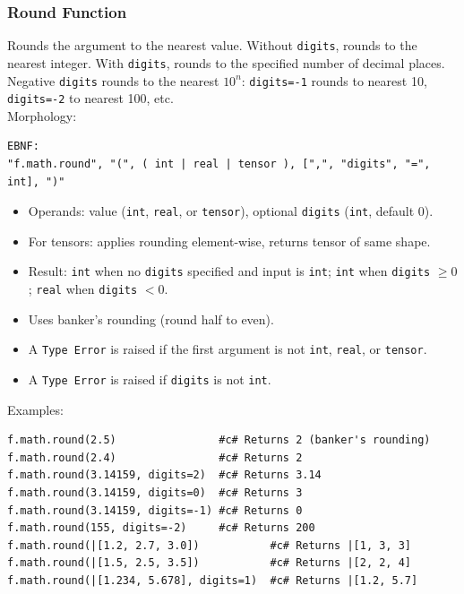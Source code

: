 \subsubsection{Round Function}
Rounds the argument to the nearest value. Without \texttt{digits}, rounds to the nearest integer. With \texttt{digits}, rounds to the specified number of decimal places. Negative \texttt{digits} rounds to the nearest $10^n$: \texttt{digits=-1} rounds to nearest 10, \texttt{digits=-2} to nearest 100, etc. \\
Morphology:
\begin{verbatim}
EBNF:
"f.math.round", "(", ( int | real | tensor ), [",", "digits", "=", int], ")"
\end{verbatim}
\begin{itemize}
\item Operands: value (\texttt{int}, \texttt{real}, or \texttt{tensor}), optional \texttt{digits} (\texttt{int}, default 0).
\item For tensors: applies rounding element-wise, returns tensor of same shape.
\item Result: \texttt{int} when no \texttt{digits} specified and input is \texttt{int}; \texttt{int} when \texttt{digits} $\geq 0$; \texttt{real} when \texttt{digits} $< 0$.
\item Uses banker's rounding (round half to even).
\item A \texttt{Type Error} is raised if the first argument is not \texttt{int}, \texttt{real}, or \texttt{tensor}.
\item A \texttt{Type Error} is raised if \texttt{digits} is not \texttt{int}.
\end{itemize}
Examples:
\begin{verbatim}
f.math.round(2.5)                #c# Returns 2 (banker's rounding)
f.math.round(2.4)                #c# Returns 2
f.math.round(3.14159, digits=2)  #c# Returns 3.14
f.math.round(3.14159, digits=0)  #c# Returns 3
f.math.round(3.14159, digits=-1) #c# Returns 0
f.math.round(155, digits=-2)     #c# Returns 200
f.math.round(|[1.2, 2.7, 3.0])           #c# Returns |[1, 3, 3]
f.math.round(|[1.5, 2.5, 3.5])           #c# Returns |[2, 2, 4]
f.math.round(|[1.234, 5.678], digits=1)  #c# Returns |[1.2, 5.7]
\end{verbatim}

